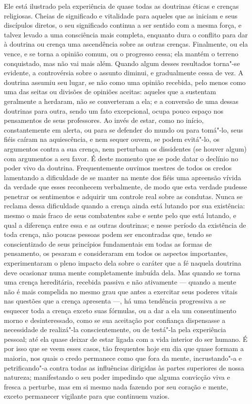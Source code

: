 Ele está ilustrado pela experiência de quase todas as doutrinas éticas e
crenças religiosas. Cheias de significado e vitalidade para aqueles que
as iniciam e seus discípulos diretos, o seu significado continua a ser
sentido com a mesma força, e talvez levado a uma consciência mais
completa, enquanto dura o conflito para dar à doutrina ou crença uma
ascendência sobre as outras crenças. Finalmente, ou ela vence, e se
torna a opinião comum, ou o progresso cessa; ela mantém o terreno
conquistado, mas não vai mais além. Quando algum desses resultados
torna"-se evidente, a controvérsia sobre o assunto diminui, e
gradualmente cessa de vez. A doutrina assumiu seu lugar, se não como
uma opinião recebida, pelo menos como uma das seitas ou divisões de
opiniões aceitas: aqueles que a sustentam geralmente a herdaram, não
se converteram a ela; e a conversão de uma dessas doutrinas para outra,
sendo um fato excepcional, ocupa pouco espaço nos pensamentos de seus
professores. Ao invés de estar, como no início, constantemente em
alerta, ou para se defender do mundo ou para tomá"-lo, seus fiéis
caíram na aquiescência, e nem sequer ouvem, se podem evitá"-lo, os
argumentos contra a sua crença, nem perturbam os dissidentes (se houver
algum) com argumentos a seu favor. É deste momento que se pode datar o
declínio no poder vivo da doutrina. Frequentemente ouvimos mestres de
todos os credos lamentando a dificuldade de se manter na mente
dos fiéis uma apreensão vívida da verdade que esses reconhecem
verbalmente, de modo que esta verdade pudesse penetrar os sentimentos e
adquirir um controle real sobre as condutas. Nunca se reclama dessa
dificuldade quando a crença ainda está lutando por sua existência:
mesmo o mais fraco de seus combatentes sabe e sente pelo que está
lutando, e qual a diferença entre essa e as outras doutrinas; e nesse
período da existência de toda crença, não poucas pessoas podem ser
encontradas que, tendo se conscientizado de seus princípios
fundamentais em todas as formas de pensamento, os pesaram e
consideraram em todos os aspectos importantes, experimentaram o pleno
impacto dela sobre o caráter que a fé naquela doutrina deve
ocasionar numa mente completamente imbuída dela. Mas quando se
torna uma crença hereditária, recebida passiva e não
ativamente --- quando a mente não é mais compelida no mesmo grau que
antes a exercitar seus poderes vitais nas questões que a crença
apresenta ---, há uma tendência progressiva a se esquecer toda a crença
exceto suas fórmulas, ou a dar a ela um consentimento morno e
desinteressado, como se sua aceitação por confiança dispensasse a
necessidade de realizá"-la conscientemente, ou de testá"-la pela
experiência pessoal; até ela quase deixar de estar ligada com a vida
interior do ser humano. É por isso que se veem esses casos, tão
frequentes hoje em dia que quase formam a maioria, nos quais o credo
permanece como que fora da mente, incrustando"-a e petrificando"-a
contra todas as influências dirigidas às partes superiores de nossa
natureza; manifestando o seu poder impedindo que alguma convicção
viva e fresca a perturbe, mas em si mesmo nada fazendo por seu
coração e mente, exceto permanecer vigilante para que continuem vazios.


